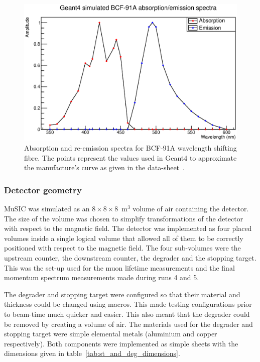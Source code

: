 \begin{figure}[hptb]
  \centering
    \includegraphics[width=.9\textwidth]{images/bcf-91a-g4.eps}
  \caption{Absorption and re-emission spectra for BCF-91A wavelength shifting fibre. The points represent the values used in Geant4 to approximate the manufacture's curve as given in the data-sheet~\cite{BCF-91A}.}
  \label{fig:images_bcf-91a-g4}
\end{figure}

\subsubsection{Detector geometry} %
\label{ssub:implementation_detector_geometry}

MuSIC was simulated as an \(8\times8\times8\)~m\(^3\) volume of air containing the detector. The size of the volume was chosen to simplify transformations of the detector with respect to the magnetic field. The detector was implemented as four placed volumes inside a single logical volume that allowed all of them to be correctly positioned with respect to the magnetic field. The four sub-volumes were the upstream counter, the downstream counter, the degrader and the stopping target. This was the set-up used for the muon lifetime measurements and the final momentum spectrum measurements made during runs 4 and 5.

The degrader and stopping target were configured so that their material and thickness could be changed using macros. This made testing configurations prior to beam-time much quicker and easier. This also meant that the degrader could be removed by creating a volume of air. The materials used for the degrader and stopping target were simple elemental metals (aluminium and copper respectively). Both components were implemented as simple sheets with the dimensions given in table~\ref{tab:st_and_deg_dimensions}.

